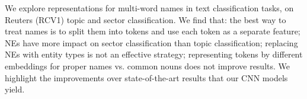 We explore representations for multi-word names in text classification tasks, on Reuters (RCV1) topic and sector classification. We find that: the best way to treat names is to split them into tokens and use each token as a separate feature; NEs have more impact on sector classification than topic classification; replacing NEs with entity types is not an effective strategy; representing tokens by different embeddings for proper names vs. common nouns does not improve results. We highlight the improvements over state-of-the-art results that our CNN models yield.

